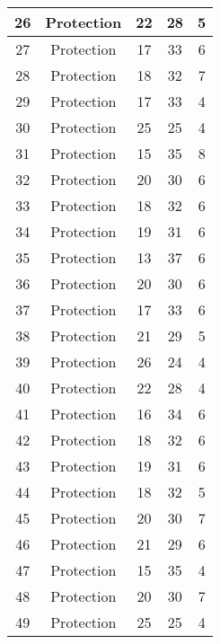 \documentclass[results.tex]{subfiles}
\begin{document}
\begin{center}
\begin{tabular}{| c || c | c | c | c |}
    \hline
    26 & Protection & 22 & 28 & 5 \\ 
    \hline
    27 & Protection & 17 & 33 & 6 \\ 
    \hline
    28 & Protection & 18 & 32 & 7 \\ 
    \hline
    29 & Protection & 17 & 33 & 4 \\ 
    \hline
    30 & Protection & 25 & 25 & 4 \\ 
    \hline
    31 & Protection & 15 & 35 & 8 \\ 
    \hline
    32 & Protection & 20 & 30 & 6 \\ 
    \hline
    33 & Protection & 18 & 32 & 6 \\ 
    \hline
    34 & Protection & 19 & 31 & 6 \\ 
    \hline
    35 & Protection & 13 & 37 & 6 \\ 
    \hline
    36 & Protection & 20 & 30 & 6 \\ 
    \hline
    37 & Protection & 17 & 33 & 6 \\ 
    \hline
    38 & Protection & 21 & 29 & 5 \\ 
    \hline
    39 & Protection & 26 & 24 & 4 \\ 
    \hline
    40 & Protection & 22 & 28 & 4 \\ 
    \hline
    41 & Protection & 16 & 34 & 6 \\ 
    \hline
    42 & Protection & 18 & 32 & 6 \\ 
    \hline
    43 & Protection & 19 & 31 & 6 \\ 
    \hline
    44 & Protection & 18 & 32 & 5 \\ 
    \hline
    45 & Protection & 20 & 30 & 7 \\ 
    \hline
    46 & Protection & 21 & 29 & 6 \\ 
    \hline
    47 & Protection & 15 & 35 & 4 \\ 
    \hline
    48 & Protection & 20 & 30 & 7 \\ 
    \hline
    49 & Protection & 25 & 25 & 4 \\ 
    \hline   \end{tabular}
\end{center}
\end{document}
